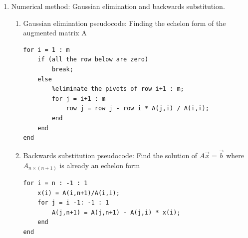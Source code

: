 \documentclass{article}
\newtheorem{thm}{Theorem}[section]
\theoremstyle{remark}
\begin{document}
\begin{enumerate}
\begin{enumerate}
\begin{thm}[Existence of a solution]
$$$$
in the echelon form of the augmented matrix.
\end{thm}
\begin{thm}[Uniqueness of a solution]
The solution of a linear system is unique if the coefficient matrix has $n$ pivots.
\end{thm}
Pivot count is easy to check. Many other conditions for uniqueness of $(n\times n)$ systems:
\begin{itemize}
\item $\det(A) \neq 0$ (show calculation for example here)
\item Column linearly independent
\item Rows linearly independent
\item Range of $T(\vec{x})=A\vec{x}$ is $\mathbb{R}^n$
\item $A\vec{x} = \vec{0}$ has only the trivial solution.
\item RREF of $A$ is $I$. 
\item $A$ can be written as a product of elementary matrices.
\item More...
\end{itemize}
\end{enumerate}

\item Numerical method: Gaussian elimination and backwards substitution.
\begin{enumerate}
\item Gaussian elimination pseudocode: Finding the echelon form of the {\color{red}augmented matrix A}
\begin{verbatim}
for i = 1 : m
    if (all the row below are zero)
        break;
    else
        %eliminate the pivots of row i+1 : m;
        for j = i+1 : m
            row j = row j - row i * A(j,i) / A(i,i);
        end
    end
end
\end{verbatim}
\item Backwards substitution pseudocode: Find the solution of $A\vec x= \vec b$ where $A_{n\times (n+1)}$ is already an echelon form 
\begin{verbatim}
for i = n : -1 : 1
    x(i) = A(i,n+1)/A(i,i);
    for j = i -1: -1 : 1
        A(j,n+1) = A(j,n+1) - A(j,i) * x(i);
    end
end
\end{verbatim}
\end{enumerate}


\end{enumerate}
\end{document}

